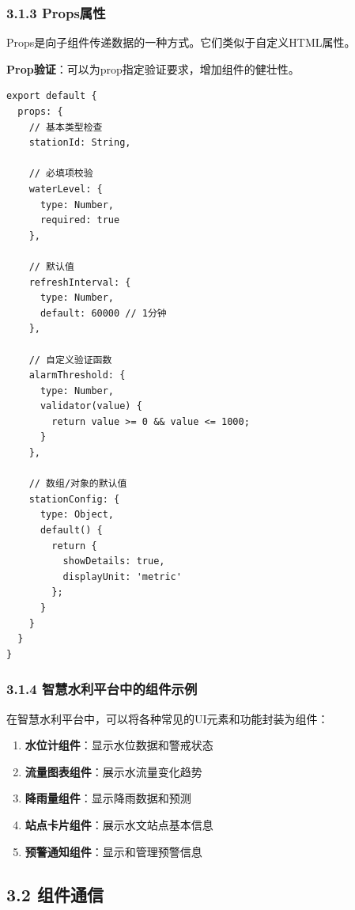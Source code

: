 \subsubsection{3.1.3 Props属性}\label{propsux5c5eux6027}

Props是向子组件传递数据的一种方式。它们类似于自定义HTML属性。

\textbf{Prop验证}：可以为prop指定验证要求，增加组件的健壮性。

\begin{lstlisting}
export default {
  props: {
    // 基本类型检查
    stationId: String,
    
    // 必填项校验
    waterLevel: {
      type: Number,
      required: true
    },
    
    // 默认值
    refreshInterval: {
      type: Number,
      default: 60000 // 1分钟
    },
    
    // 自定义验证函数
    alarmThreshold: {
      type: Number,
      validator(value) {
        return value >= 0 && value <= 1000;
      }
    },
    
    // 数组/对象的默认值
    stationConfig: {
      type: Object,
      default() {
        return { 
          showDetails: true,
          displayUnit: 'metric'
        };
      }
    }
  }
}
\end{lstlisting}

\subsubsection{3.1.4
智慧水利平台中的组件示例}\label{ux667aux6167ux6c34ux5229ux5e73ux53f0ux4e2dux7684ux7ec4ux4ef6ux793aux4f8b}

在智慧水利平台中，可以将各种常见的UI元素和功能封装为组件：

\begin{enumerate}
\def\labelenumi{\arabic{enumi}.}
\tightlist
\item
  \textbf{水位计组件}：显示水位数据和警戒状态
\item
  \textbf{流量图表组件}：展示水流量变化趋势
\item
  \textbf{降雨量组件}：显示降雨数据和预测
\item
  \textbf{站点卡片组件}：展示水文站点基本信息
\item
  \textbf{预警通知组件}：显示和管理预警信息
\end{enumerate}

\subsection{3.2 组件通信}\label{ux7ec4ux4ef6ux901aux4fe1}

